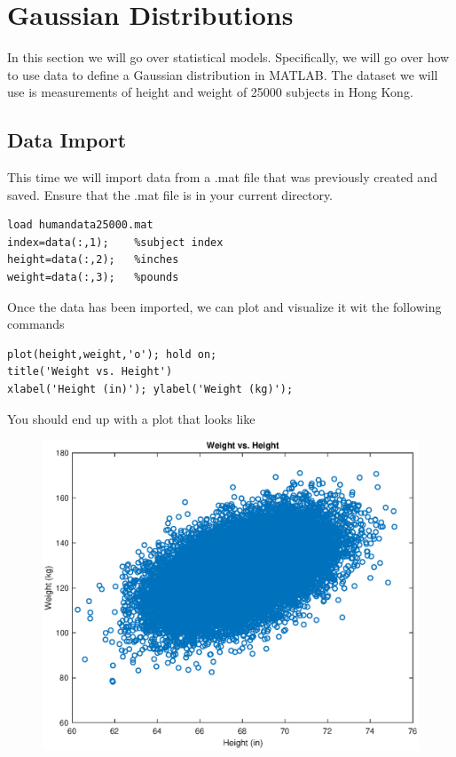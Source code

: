 \documentclass[12pt]{article}
\begin{document}
\newpage

\section{Gaussian Distributions}

In this section we will go over statistical models. Specifically, we will go over how to use data to define a Gaussian distribution in MATLAB. The dataset we will use is measurements of height and weight of 25000 subjects in Hong Kong\cite{leung_weight-for-age_1996}. 

\subsection{Data Import}

This time we will import data from a .mat file that was previously created and saved. Ensure that the .mat file is in your current directory. 

\begin{lstlisting}[frame=single]
load humandata25000.mat
index=data(:,1);    %subject index
height=data(:,2);   %inches 
weight=data(:,3);   %pounds
\end{lstlisting}

Once the data has been imported, we can plot and visualize it wit the following commands

\begin{lstlisting}[frame=single]
plot(height,weight,'o'); hold on;
title('Weight vs. Height')
xlabel('Height (in)'); ylabel('Weight (kg)');
\end{lstlisting}

You should end up with a plot that looks like

\begin{figure}[H]
\centering
\includegraphics[width=0.75\linewidth]{matlab/dataHeightWeight/plotHeightWeight.eps}
\end{figure}
\end{document}
